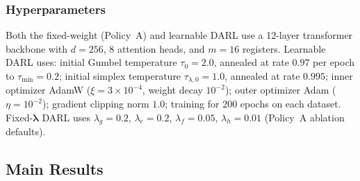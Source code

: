 \documentclass[lettersize,journal]{IEEEtran}
\newcommand{\lambdavec}{\boldsymbol{\lambda}}
\begin{document}
\subsubsection{Hyperparameters}

Both the fixed-weight (Policy~A) and learnable DARL use a 12-layer transformer backbone with
$d=256$, 8 attention heads, and $m=16$ registers.
Learnable DARL uses: initial Gumbel temperature $\tau_0 = 2.0$,
annealed at rate $0.97$ per epoch to $\tau_{\min} = 0.2$;
initial simplex temperature $\tau_{\lambda,0} = 1.0$,
annealed at rate $0.995$;
inner optimizer AdamW ($\xi = 3 \times 10^{-4}$,
weight decay $10^{-2}$);
outer optimizer Adam ($\eta = 10^{-2}$);
gradient clipping norm $1.0$;
training for 200 epochs on each dataset.
Fixed-$\lambdavec$ DARL uses $\lambda_g=0.2$, $\lambda_e=0.2$,
$\lambda_f=0.05$, $\lambda_h=0.01$ (Policy~A ablation defaults).

\subsection{Main Results}
\end{document}
